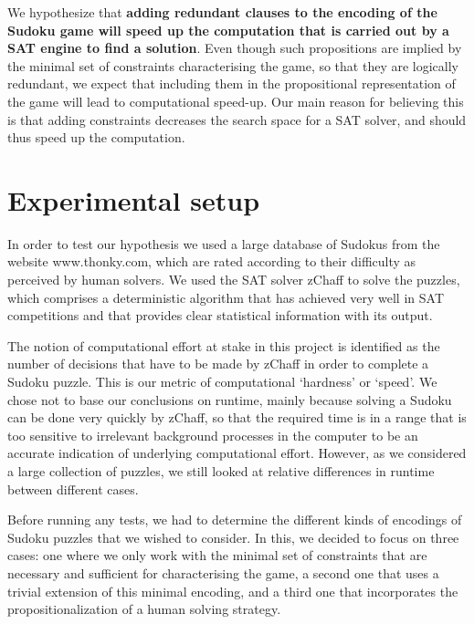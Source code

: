 \documentclass[10pt,a4paper,leqno]{article}
\begin{document}
We hypothesize that \textbf{adding redundant clauses to the encoding of the Sudoku game will speed up the computation that is carried out by a SAT engine to find a solution}. Even though such propositions are implied by the minimal set of constraints characterising the game, so that they are logically redundant, we expect that including them in the propositional representation of the game will lead to computational speed-up. Our main reason for believing this is that adding constraints decreases the search space for a SAT solver, and should thus speed up the computation. 

\section*{Experimental setup}

 
In order to test our hypothesis we used a large database of Sudokus from the website www.thonky.com, which are rated according to their difficulty as perceived by human solvers. We used the SAT solver zChaff to solve the puzzles, which comprises a deterministic algorithm that has achieved very well in SAT competitions and that provides clear statistical information with its output. 

The notion of computational effort at stake in this project is identified as the number of decisions that have to be made by zChaff in order to complete a Sudoku puzzle. This is our metric of computational `hardness' or `speed'. We chose not to base our conclusions on runtime, mainly because solving a Sudoku can be done very quickly by zChaff, so that the required time is in a range that is too sensitive to irrelevant background processes in the computer to be an accurate indication of underlying computational effort. However, as we considered a large collection of puzzles, we still looked at relative differences in runtime between different cases. 

Before running any tests, we had to determine the different kinds of encodings of Sudoku puzzles that we wished to consider. In this, we decided to focus on three cases: one where we only work with the minimal set of constraints that are necessary and sufficient for characterising the game, a second one that uses a trivial extension of this minimal encoding, and a third one that incorporates the propositionalization of a human solving strategy. 
\end{document}
